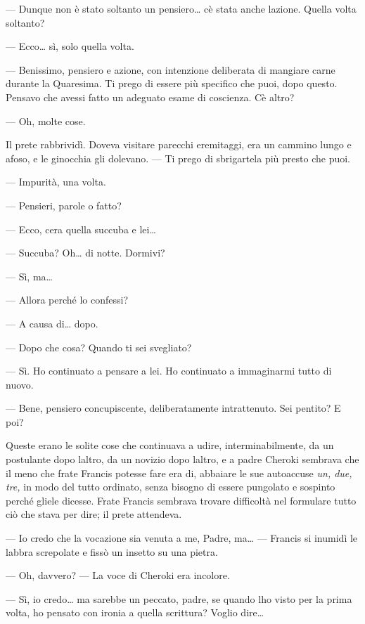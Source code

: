 --- Dunque non è stato soltanto un pensiero\ldots{} c\textquotesingle è
stata anche l\textquotesingle azione. Quella volta soltanto?

--- Ecco\ldots{} sì, solo quella volta.

--- Benissimo, pensiero e azione, con intenzione deliberata di mangiare
carne durante la Quaresima. Ti prego di essere più specifico che puoi,
dopo questo. Pensavo che avessi fatto un adeguato esame di coscienza.
C\textquotesingle è altro?

--- Oh, molte cose.

Il prete rabbrividì. Doveva visitare parecchi eremitaggi, era un cammino
lungo e afoso, e le ginocchia gli dolevano. --- Ti prego di sbrigartela
più presto che puoi.

--- Impurità, una volta.

--- Pensieri, parole o fatto?

--- Ecco, c\textquotesingle era quella succuba e lei\ldots{}

--- Succuba? Oh\ldots{} di notte. Dormivi?

--- Sì, ma\ldots{}

--- Allora perché lo confessi?

--- A causa di\ldots{} dopo.

--- Dopo che cosa? Quando ti sei svegliato?

--- Sì. Ho continuato a pensare a lei. Ho continuato a immaginarmi tutto
di nuovo.

--- Bene, pensiero concupiscente, deliberatamente intrattenuto. Sei
pentito? E poi?

Queste erano le solite cose che continuava a udire, interminabilmente,
da un postulante dopo l\textquotesingle altro, da un novizio dopo
l\textquotesingle altro, e a padre Cheroki sembrava che il meno che
frate Francis potesse fare era di, abbaiare le sue autoaccuse \emph{un,
	due, tre,} in modo del tutto ordinato, senza bisogno di essere pungolato
e sospinto perché gliele dicesse. Frate Francis sembrava trovare
difficoltà nel formulare tutto ciò che stava per dire; il prete
attendeva.

--- Io credo che la vocazione sia venuta a me, Padre, ma\ldots{} ---
Francis si inumidì le labbra screpolate e fissò un insetto su una
pietra.

--- Oh, davvero? --- La voce di Cheroki era incolore.

--- Sì, io credo\ldots{} ma sarebbe un peccato, padre, se quando
l\textquotesingle ho visto per la prima volta, ho pensato con ironia a
quella scrittura? Voglio dire\ldots{}

